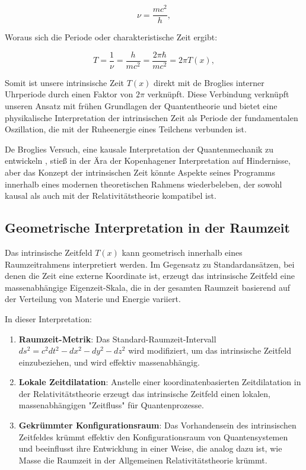 \documentclass[12pt,a4paper]{article}
\newcommand{\Tfield}{T(x)}
\begin{document}
	\begin{equation}
		\nu = \frac{mc^2}{h},
		\label{eq:debroglie_frequency}
	\end{equation}
	
	Woraus sich die Periode oder charakteristische Zeit ergibt:
	
	\begin{equation}
		T = \frac{1}{\nu} = \frac{h}{mc^2} = \frac{2\pi\hbar}{mc^2} = 2\pi \Tfield,
		\label{eq:debroglie_period}
	\end{equation}
	
	Somit ist unsere intrinsische Zeit $\Tfield$ direkt mit de Broglies interner Uhrperiode durch einen Faktor von $2\pi$ verknüpft. Diese Verbindung verknüpft unseren Ansatz mit frühen Grundlagen der Quantentheorie und bietet eine physikalische Interpretation der intrinsischen Zeit als Periode der fundamentalen Oszillation, die mit der Ruheenergie eines Teilchens verbunden ist.
	
	De Broglies Versuch, eine kausale Interpretation der Quantenmechanik zu entwickeln \cite{deBroglie1927, deBroglie1930}, stieß in der Ära der Kopenhagener Interpretation auf Hindernisse, aber das Konzept der intrinsischen Zeit könnte Aspekte seines Programms innerhalb eines modernen theoretischen Rahmens wiederbeleben, der sowohl kausal als auch mit der Relativitätstheorie kompatibel ist.
	
	\subsection{Geometrische Interpretation in der Raumzeit}
	\label{subsec:geometric_interpretation}
	
	Das intrinsische Zeitfeld $\Tfield$ kann geometrisch innerhalb eines Raumzeitrahmens interpretiert werden. Im Gegensatz zu Standardansätzen, bei denen die Zeit eine externe Koordinate ist, erzeugt das intrinsische Zeitfeld eine massenabhängige Eigenzeit-Skala, die in der gesamten Raumzeit basierend auf der Verteilung von Materie und Energie variiert.
	
	In dieser Interpretation:
	
	\begin{enumerate}
		\item \textbf{Raumzeit-Metrik}: Das Standard-Raumzeit-Intervall $ds^2 = c^2dt^2 - dx^2 - dy^2 - dz^2$ wird modifiziert, um das intrinsische Zeitfeld einzubeziehen, und wird effektiv massenabhängig.
		
		\item \textbf{Lokale Zeitdilatation}: Anstelle einer koordinatenbasierten Zeitdilatation in der Relativitätstheorie erzeugt das intrinsische Zeitfeld einen lokalen, massenabhängigen "Zeitfluss" für Quantenprozesse.
		
		\item \textbf{Gekrümmter Konfigurationsraum}: Das Vorhandensein des intrinsischen Zeitfeldes krümmt effektiv den Konfigurationsraum von Quantensystemen und beeinflusst ihre Entwicklung in einer Weise, die analog dazu ist, wie Masse die Raumzeit in der Allgemeinen Relativitätstheorie krümmt.
	\end{enumerate}
	
\end{document}
